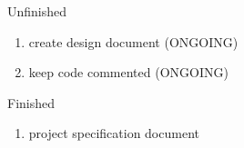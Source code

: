 \documentclass[12pt]{article}
\begin{document}
\begin{section}{Unfinished}
\begin{enumerate}
\item create design document (ONGOING)
\item keep code commented (ONGOING)


\end{enumerate}
\end{section}

\begin{section}{Finished}
\begin{enumerate}

\item project specification document

\end{enumerate}
\end{section}
\end{document}
